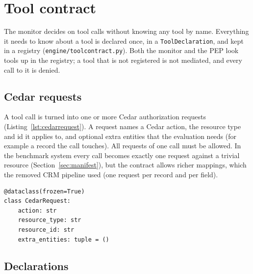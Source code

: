 \documentclass[11pt,a4paper]{article}
\DeclareRobustCommand{\code}[1]{{\renewcommand{\_}{\textunderscore\allowbreak}\texttt{#1}}}
\begin{document}
\section{Tool contract}
\label{sec:contract}

The monitor decides on tool calls without knowing any tool by name. Everything it needs
to know about a tool is declared once, in a \code{ToolDeclaration}, and kept in a
registry (\code{engine/tool\_contract.py}). Both the monitor and the PEP look tools up in
the registry; a tool that is not registered is not mediated, and every call to it is
denied.

\subsection{Cedar requests}

A tool call is turned into one or more Cedar authorization requests
(Listing~\ref{lst:cedarrequest}). A request names a Cedar action, the resource type and
id it applies to, and optional extra entities that the evaluation needs (for example a
record the call touches). All requests of one call must be allowed. In the benchmark
system every call becomes exactly one request against a trivial resource
(Section~\ref{sec:manifest}), but the contract allows richer mappings, which the removed
CRM pipeline used (one request per record and per field).

\begin{lstlisting}[firstnumber=27,style=py,caption={A Cedar request derived from a tool call (\texttt{engine/tool\_contract.py}, lines 27--32)},label={lst:cedarrequest}]
@dataclass(frozen=True)
class CedarRequest:
    action: str
    resource_type: str
    resource_id: str
    extra_entities: tuple = ()
\end{lstlisting}

\subsection{Declarations}
\end{document}
